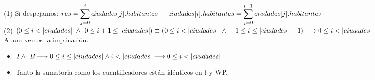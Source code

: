 \documentclass[10pt,a4paper,fleqn]{article}
\begin{document}
(1) Si despejamos: $res = \small \displaystyle \sum_{j=0}^{i} ciudades[j].habitantes \ - ciudades[i].habitantes = \small \displaystyle \sum_{j=0}^{i-1} ciudades[j].habitantes$\\
(2) $(0 \leq i < |ciudades| \ \land \ 0 \leq i+1 \leq |ciudades|)\equiv(0 \leq i < |ciudades| \ \land \ -1 \leq i \leq |ciudades|-1)\\
\implica 0 \leq i <|ciudades|$\\
Ahora vemos la implicación: \\
\begin{itemize}
    \item \parbox[t]{\textwidth}{$I \land \ B \longrightarrow 0 \leq i \leq |ciudades| \land i < |ciudades| \longrightarrow 0 \leq i < |ciudades|$}
    \item \parbox[t]{\textwidth}{Tanto la sumatoria como los cuantificadores están idénticos en I y WP.}
\end{itemize}
\end{document}
